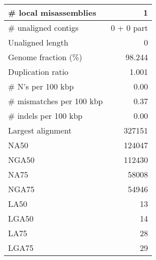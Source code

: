\documentclass[12pt,a4paper]{article}
\begin{document}
\begin{table}[ht]
\begin{center}
\begin{tabular}{|l*{1}{|r}|}
\# local misassemblies & 1 \\ \hline
\# unaligned contigs & 0 + 0 part \\ \hline
Unaligned length & 0 \\ \hline
Genome fraction (\%) & 98.244 \\ \hline
Duplication ratio & 1.001 \\ \hline
\# N's per 100 kbp & 0.00 \\ \hline
\# mismatches per 100 kbp & 0.37 \\ \hline
\# indels per 100 kbp & 0.00 \\ \hline
Largest alignment & 327151 \\ \hline
NA50 & 124047 \\ \hline
NGA50 & 112430 \\ \hline
NA75 & 58008 \\ \hline
NGA75 & 54946 \\ \hline
LA50 & 13 \\ \hline
LGA50 & 14 \\ \hline
LA75 & 28 \\ \hline
LGA75 & 29 \\ \hline
\end{tabular}
\end{center}
\end{table}
\end{document}
